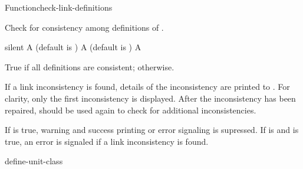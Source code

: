 \documentclass[10pt,twoside,english,pdftex]{article}
\begin{document}
\begin{functiondoc}{Function}{check-link-definitions}{
    \returns{} }
%

\fnsyntax

\fnpurpose Check for consistency among  definitions of
.

\fnpackage {}

\fnmodule {}

\fnargs
\begin{args}{silent}
\arg[silent] A  (default is \nil)
\arg[errorp] A  (default is \nil) 
\arg[boolean] A 
\end{args}

\fnreturns True if all  definitions are consistent; \nil{} otherwise. 

\fndescription If a link inconsistency is found, details of the inconsistency
are printed to .  For clarity, only the first
inconsistency is displayed.  After the inconsistency has been repaired,
 should be used again to check for
additional inconsistencies.

If  is true, warning and success printing or error signaling is
supressed.  If  is \nil{} and  is true, an error
is signaled if a link inconsistency is found.

\begin{alsos}{define-unit-class}
\end{alsos}


\end{functiondoc}
\end{document}
